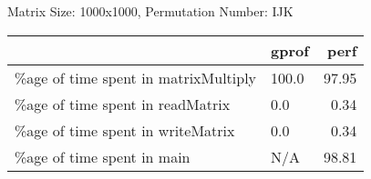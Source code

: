 \documentclass{article}
\begin{document}
    Matrix Size: 1000x1000, Permutation Number: IJK \\
    \begin{tabular}{llr}
\hline
                                      & gprof   &   perf \\
\hline
 \%age of time spent in matrixMultiply & 100.0   &  97.95 \\
 \%age of time spent in readMatrix     & 0.0     &   0.34 \\
 \%age of time spent in writeMatrix    & 0.0     &   0.34 \\
 \%age of time spent in main           & N/A     &  98.81 \\
\hline
\end{tabular}
    
\end{document}
